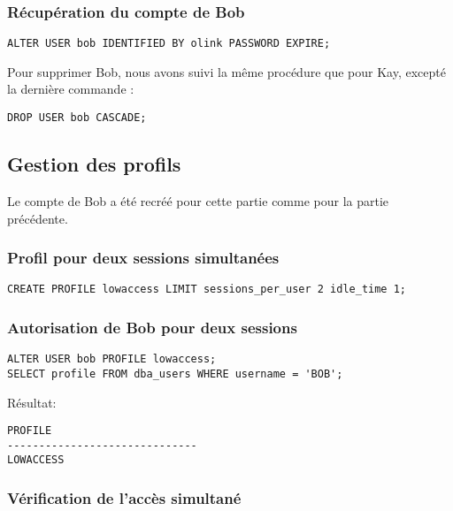 \subsubsection{Récupération du compte de Bob}

\begin{verbatim}
ALTER USER bob IDENTIFIED BY olink PASSWORD EXPIRE;
\end{verbatim}

Pour supprimer Bob, nous avons suivi la même procédure que pour Kay, excepté la dernière commande :
\begin{verbatim}
DROP USER bob CASCADE;
\end{verbatim}

\subsection{Gestion des profils}

Le compte de Bob a été recréé pour cette partie comme pour la partie précédente.

\subsubsection{Profil pour deux sessions simultanées}

\begin{verbatim}
CREATE PROFILE lowaccess LIMIT sessions_per_user 2 idle_time 1;
\end{verbatim}

\subsubsection{Autorisation de Bob pour deux sessions}

\begin{verbatim}
ALTER USER bob PROFILE lowaccess;
SELECT profile FROM dba_users WHERE username = 'BOB';
\end{verbatim}

Résultat:
\begin{verbatim}
PROFILE                                                                         
------------------------------                                                  
LOWACCESS                                                                       
\end{verbatim}

\subsubsection{Vérification de l’accès simultané}

